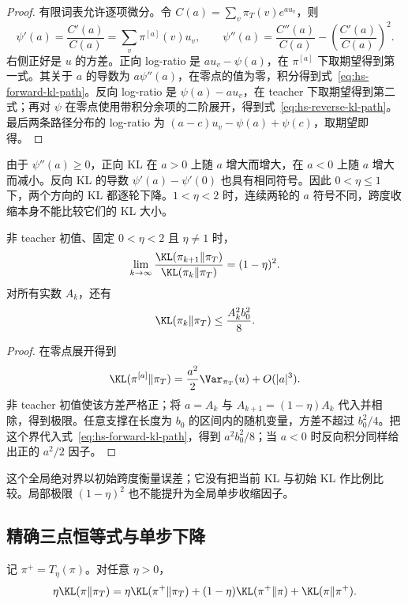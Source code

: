 \begin{proof}
有限词表允许逐项微分。令 $C(a)=\sum_v\pi_T(v)e^{au_v}$，则
\[
 \psi'(a)=\frac{C'(a)}{C(a)}=\sum_v\pi^{[a]}(v)u_v,
 \qquad
 \psi''(a)=\frac{C''(a)}{C(a)}-
          \left(\frac{C'(a)}{C(a)}\right)^2.
\]
右侧正好是 $u$ 的方差。正向 log-ratio 是 $au_v-\psi(a)$，在 $\pi^{[a]}$ 下取期望得到第一式。其关于 $a$ 的导数为 $a\psi''(a)$，在零点的值为零，积分得到式~\eqref{eq:hs-forward-kl-path}。反向 log-ratio 是 $\psi(a)-au_v$，在 teacher 下取期望得到第二式；再对 $\psi$ 在零点使用带积分余项的二阶展开，得到式~\eqref{eq:hs-reverse-kl-path}。最后两条路径分布的 log-ratio 为 $(a-c)u_v-\psi(a)+\psi(c)$，取期望即得。
\end{proof}

由于 $\psi''(a)\geq0$，正向 KL 在 $a>0$ 上随 $a$ 增大而增大，在 $a<0$ 上随 $a$ 增大而减小。反向 KL 的导数 $\psi'(a)-\psi'(0)$ 也具有相同符号。因此 $0<\eta\leq1$ 下，两个方向的 KL 都逐轮下降。$1<\eta<2$ 时，连续两轮的 $a$ 符号不同，跨度收缩本身不能比较它们的 KL 大小。

\begin{corollary}[局部 KL 速率与全局绝对界]
非 teacher 初值、固定 $0<\eta<2$ 且 $\eta\neq1$ 时，
\[
 \lim_{k\to\infty}
 \frac{\KL(\pi_{k+1}\Vert\pi_T)}{\KL(\pi_k\Vert\pi_T)}
 =(1-\eta)^2.
\]
对所有实数 $A_k$，还有
\[
 \KL(\pi_k\Vert\pi_T)\leq\frac{A_k^2b_0^2}{8}.
\]
\end{corollary}

\begin{proof}
在零点展开得到
\[
 \KL(\pi^{[a]}\Vert\pi_T)
 =\frac{a^2}{2}\Var_{\pi_T}(u)+O(|a|^3).
\]
非 teacher 初值使该方差严格正；将 $a=A_k$ 与 $A_{k+1}=(1-\eta)A_k$ 代入并相除，得到极限。任意支撑在长度为 $b_0$ 的区间内的随机变量，方差不超过 $b_0^2/4$。把这个界代入式~\eqref{eq:hs-forward-kl-path}，得到 $a^2b_0^2/8$；当 $a<0$ 时反向积分同样给出正的 $a^2/2$ 因子。
\end{proof}

这个全局绝对界以初始跨度衡量误差；它没有把当前 KL 与初始 KL 作比例比较。局部极限 $(1-\eta)^2$ 也不能提升为全局单步收缩因子。

\subsection{精确三点恒等式与单步下降}

\begin{theorem}
\label{thm:hs-three-point}
记 $\pi^+=T_\eta(\pi)$。对任意 $\eta>0$，
\begin{equation}\label{eq:hs-three-point}
 \eta\KL(\pi\Vert\pi_T)
 =\eta\KL(\pi^+\Vert\pi_T)
 +(1-\eta)\KL(\pi^+\Vert\pi)
 +\KL(\pi\Vert\pi^+).
\end{equation}
\end{theorem}

